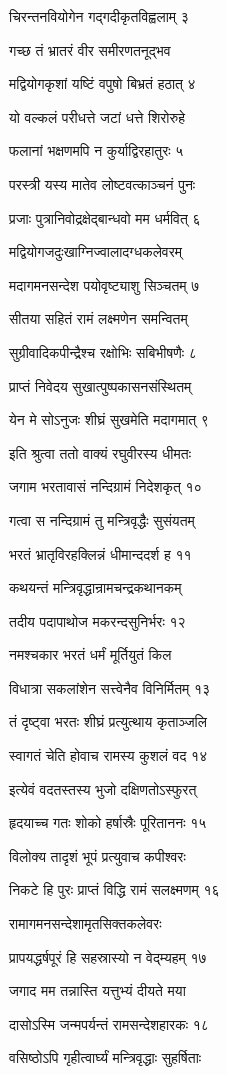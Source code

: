चिरन्तनवियोगेन गद्गदीकृतविह्वलाम् ३

गच्छ तं भ्रातरं वीर समीरणतनूद्भव

मद्वियोगकृशां यष्टिं वपुषो बिभ्रतं हठात् ४

यो वल्कलं परीधत्ते जटां धत्ते शिरोरुहे

फलानां भक्षणमपि न कुर्याद्विरहातुरः ५

परस्त्री यस्य मातेव लोष्टवत्काञ्चनं पुनः

प्रजाः पुत्रानिवोद्रक्षेद्बान्धवो मम धर्मवित् ६

मद्वियोगजदुःखाग्निज्वालादग्धकलेवरम्

मदागमनसन्देश पयोवृष्ट्याशु सिञ्चतम् ७

सीतया सहितं रामं लक्ष्मणेन समन्वितम्

सुग्रीवादिकपीन्द्रैश्च रक्षोभिः सबिभीषणैः ८

प्राप्तं निवेदय सुखात्पुष्पकासनसंस्थितम्

येन मे सोऽनुजः शीघ्रं सुखमेति मदागमात् ९

इति श्रुत्वा ततो वाक्यं रघुवीरस्य धीमतः

जगाम भरतावासं नन्दिग्रामं निदेशकृत् १०

गत्वा स नन्दिग्रामं तु मन्त्रिवृद्धैः सुसंयतम्

भरतं भ्रातृविरहक्लिन्नं धीमान्ददर्श ह ११

कथयन्तं मन्त्रिवृद्धान्रामचन्द्रकथानकम्

तदीय पदापाथोज मकरन्दसुनिर्भरः १२

नमश्चकार भरतं धर्मं मूर्तियुतं किल

विधात्रा सकलांशेन सत्त्वेनैव विनिर्मितम् १३

तं दृष्ट्वा भरतः शीघ्रं प्रत्युत्थाय कृताञ्जलि

स्वागतं चेति होवाच रामस्य कुशलं वद १४

इत्येवं वदतस्तस्य भुजो दक्षिणतोऽस्फुरत्

हृदयाच्च गतः शोको हर्षास्रैः पूरिताननः १५

विलोक्य तादृशं भूपं प्रत्युवाच कपीश्वरः

निकटे हि पुरः प्राप्तं विद्धि रामं सलक्ष्मणम् १६

रामागमनसन्देशामृतसिक्तकलेवरः

प्रापयद्धर्षपूरं हि सहस्रास्यो न वेद्म्यहम् १७

जगाद मम तन्नास्ति यत्तुभ्यं दीयते मया

दासोऽस्मि जन्मपर्यन्तं रामसन्देशहारकः १८

वसिष्ठोऽपि गृहीत्वार्घ्यं मन्त्रिवृद्धाः सुहर्षिताः

